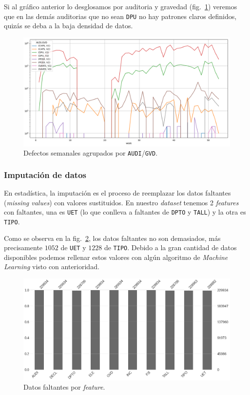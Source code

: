 \documentclass[a4paper,12pt]{article}
\begin{document}
Si al gráfico anterior lo desglosamos por auditoria y gravedad (fig.~\ref{fig:defectsperaudigvdweek}) veremos que en las demás auditorias que no sean \texttt{DPU} no hay patrones claros definidos, quizás se deba a la baja densidad de datos.

\begin{figure}[H]
	\begin{center}
	\includegraphics[width=1\textwidth]{audigvd.png}
  	\caption{Defectos semanales agrupados por \texttt{AUDI}/\texttt{GVD}.}
  	\label{fig:defectsperaudigvdweek}
  	\end{center}
\end{figure}

\subsubsection{Imputación de datos}
En estadística, la imputación es el proceso de reemplazar los datos faltantes (\textit{missing values}) con valores sustituidos. En nuestro \textit{dataset} tenemos 2 \textit{features} con faltantes, una es \texttt{UET} (lo que conlleva a faltantes de \texttt{DPTO} y \texttt{TALL}) y la otra es \texttt{TIPO}.

Como se observa en la fig.~\ref{fig:missingvalue}, los datos faltantes no son demasiados, más precisamente $1052$ de \texttt{UET} y $1228$ de \texttt{TIPO}. Debido a la gran cantidad de datos disponibles podemos rellenar estos valores con algún algoritmo de \textit{Machine Learning} visto con anterioridad.

\begin{figure}[H]
	\begin{center}
	\includegraphics[width=1\textwidth]{tesis_66.png}
  	\caption{Datos faltantes por \textit{feature}.}
  	\label{fig:missingvalue}
  	\end{center}
\end{figure}
\end{document}
